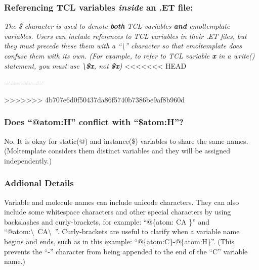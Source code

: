 \documentclass[11pt]{article}
\begin{document}


\subsubsection*{Referencing TCL variables \textit{inside} an .ET file:}
\textit{
The \$ character is used to denote \textbf{both} TCL variables
\textbf{and} emoltemplate variables.  Users can include references
to TCL variables in their .ET files, but they must precede these
them with a ``\textbackslash'' character so that emoltemplate does
confuse them with its own.
(For example, to refer to TCL variable \textbf{x} in a write() statement,
you must use \textbf{\textbackslash\$x}, not \textbf{\$x})
}
<<<<<<< HEAD


=======


>>>>>>> 4b707e6d0f50437da86f5740b7386be9af8b960d
\subsubsection*{Does ``@atom:H'' conflict with ``\$atom:H''?}
\label{sec:vardetails}
No.  It is okay for static(@) and instance(\$) variables to share the same names.
(Moltemplate considers them distinct variables and they will be assigned independently.)

\subsubsection*{Addional Details}
Variable and molecule names can include unicode characters.
They can also include some whitespace characters and other special characters
by using backslashes and curly-brackets, for example:
``@\{atom: CA \}'' and ``@atom:\textbackslash\ CA\textbackslash\ ''.
Curly-brackets are useful to clarify when a variable name begins and ends,
such as in this example: ``@\{atom:C\}-@\{atom:H\}''.
(This prevents the ``-'' character from being appended to the end of the 
``C'' variable name.)
\end{document}
